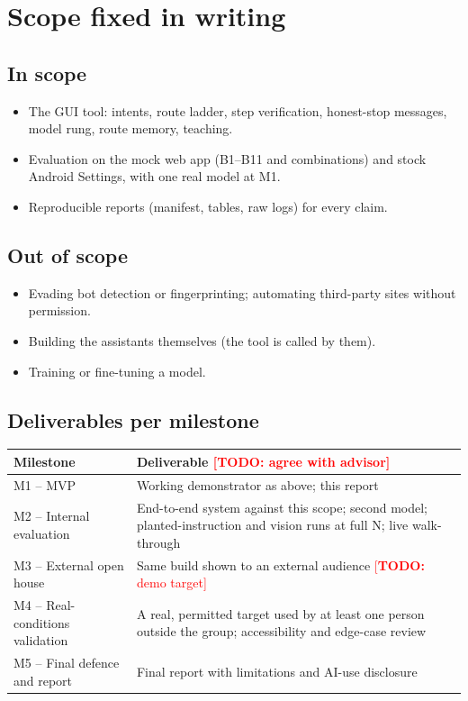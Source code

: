 \documentclass[11pt,a4paper]{article}
\newcommand{\todo}[1]{\textcolor{red}{[\textbf{TODO:} #1]}}
\begin{document}
\section{Scope fixed in writing}\label{sec:scope}
\subsection{In scope}
\begin{itemize}
\item The GUI tool: intents, route ladder, step verification, honest-stop messages, model rung, route memory, teaching.
\item Evaluation on the mock web app (B1--B11 and combinations) and stock Android Settings, with one real model at M1.
\item Reproducible reports (manifest, tables, raw logs) for every claim.
\end{itemize}
\subsection{Out of scope}
\begin{itemize}
\item Evading bot detection or fingerprinting; automating third-party sites without permission.
\item Building the assistants themselves (the tool is called by them).
\item Training or fine-tuning a model.
\end{itemize}
\subsection{Deliverables per milestone}
\begin{table}[h]\centering\small
\begin{tabularx}{\textwidth}{@{}l X@{}}
\toprule
Milestone & Deliverable \todo{agree with advisor}\\\midrule
M1 -- MVP & Working demonstrator as above; this report\\
M2 -- Internal evaluation & End-to-end system against this scope; second model; planted-instruction and vision runs at full N; live walk-through\\
M3 -- External open house & Same build shown to an external audience \todo{demo target}\\
M4 -- Real-conditions validation & A real, permitted target used by at least one person outside the group; accessibility and edge-case review\\
M5 -- Final defence and report & Final report with limitations and AI-use disclosure\\
\bottomrule
\end{tabularx}
\end{table}
\end{document}
